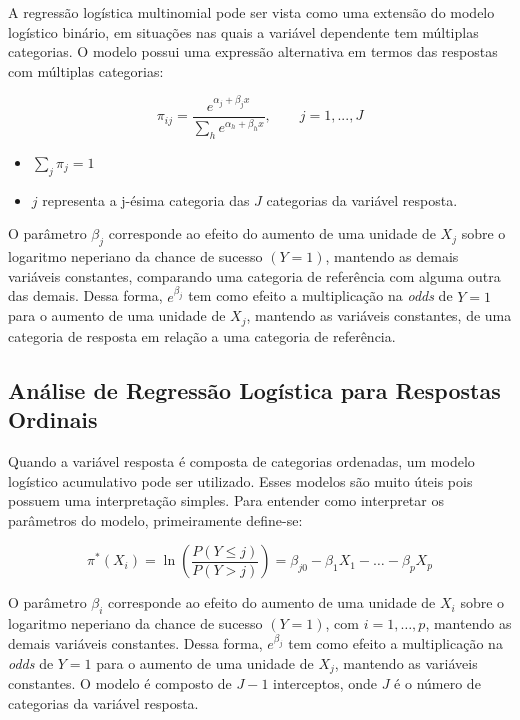 \documentclass[
]{estat/estat}
\providecommand{\tightlist}{%
  \setlength{\itemsep}{0pt}\setlength{\parskip}{0pt}}\usepackage{longtable,booktabs,array}
\begin{document}
A regressão logística multinomial pode ser vista como uma extensão do
modelo logístico binário, em situações nas quais a variável dependente
tem múltiplas categorias. O modelo possui uma expressão alternativa em
termos das respostas com múltiplas categorias:

\[
\pi_{ij}=\frac{e^{\alpha_j+\beta_jx}}{\sum_h e^{\alpha_h+\beta_hx}}, \qquad j=1, ..., J
\]

\begin{itemize}
\tightlist
\item
  \(\sum_j\pi_j=1\)
\item
  \(j\) representa a j-ésima categoria das \(J\) categorias da variável
  resposta.
\end{itemize}

O parâmetro \(\beta_{j}\) corresponde ao efeito do aumento de uma
unidade de \(X_{j}\) sobre o logaritmo neperiano da chance de sucesso
\((Y=1)\), mantendo as demais variáveis constantes, comparando uma
categoria de referência com alguma outra das demais. Dessa forma,
\(\displaystyle e^{\beta_j}\) tem como efeito a multiplicação na
\emph{odds} de \(Y=1\) para o aumento de uma unidade de \(X_{j}\),
mantendo as variáveis constantes, de uma categoria de resposta em
relação a uma categoria de referência.

\subsection{Análise de Regressão Logística para Respostas
Ordinais}\label{anuxe1lise-de-regressuxe3o-loguxedstica-para-respostas-ordinais}

Quando a variável resposta é composta de categorias ordenadas, um modelo
logístico acumulativo pode ser utilizado. Esses modelos são muito úteis
pois possuem uma interpretação simples. Para entender como interpretar
os parâmetros do modelo, primeiramente define-se:

\[
\pi^*(X_i) = \ln\left(\frac{P(Y \le j)}{P(Y > j)}\right) = \beta_{j0} - \beta_1 X_1 - \ldots - \beta_p X_p
\]

O parâmetro \(\beta_{i}\) corresponde ao efeito do aumento de uma
unidade de \(X_{i}\) sobre o logaritmo neperiano da chance de sucesso
\((Y=1)\), com \(i=1, \ldots, p\), mantendo as demais variáveis
constantes. Dessa forma, \(\displaystyle e^{\beta_j}\) tem como efeito a
multiplicação na \emph{odds} de \(Y=1\) para o aumento de uma unidade de
\(X_{j}\), mantendo as variáveis constantes. O modelo é composto de
\(J-1\) interceptos, onde \(J\) é o número de categorias da variável
resposta.
\end{document}
